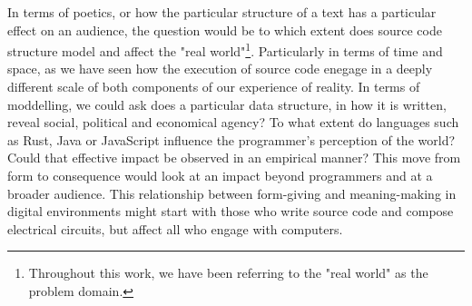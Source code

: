 In terms of poetics, or how the particular structure of a text has a particular effect on an audience, the question would be to which extent does source code structure model and affect the "real world"\footnote{Throughout this work, we have been referring to the "real world" as the problem domain.}. Particularly in terms of  time and space, as we have seen how the execution of source code enegage in a deeply different scale of both components of our experience of reality. In terms of moddelling, we could ask does a particular data structure, in how it is written, reveal social, political and economical agency? To what extent do languages such as Rust, Java or JavaScript influence the programmer's perception of the world? Could that effective impact be observed in an empirical manner? This move from form to consequence would look at an impact beyond programmers and at a broader audience. This relationship between form-giving and meaning-making in digital environments might start with those who write source code and compose electrical circuits, but affect all who engage with computers.